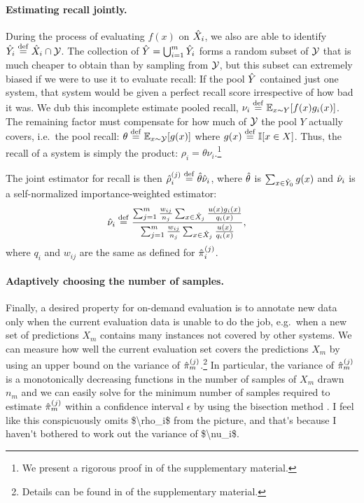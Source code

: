 \paragraph{Estimating recall jointly.}
During the process of evaluating $f(x)$ on ${\hat{X}}_i$, we also are able to identify ${\hat{Y}}_i \stackrel{\rm def}{=} {\hat{X}}_i \cap \mathcal{Y}$.
The collection of ${\hat{Y}} = \bigcup_{i=1}^m {\hat{Y}}_i$ forms a random subset of $\mathcal{Y}$ that is much cheaper to obtain than by sampling from $\mathcal{Y}$, but this subset can extremely biased if we were to use it to evaluate recall: 
If the pool ${\hat{Y}}$ contained just one system, that system would be given a perfect recall score irrespective of how bad it was.
We dub this incomplete estimate pooled recall, $\nu_i \stackrel{\rm def}{=} \mathbb{E}_{x \sim Y}[f(x) g_i(x)]$.
The remaining factor must compensate for how much of $\mathcal{Y}$ the pool $Y$ actually covers, i.e.\ the pool recall: $\theta \stackrel{\rm def}{=} \mathbb{E}_{x \sim \mathcal{Y}}[g(x)]$ where $g(x) \stackrel{\rm def}{=} \mathbb{I}[x \in X]$.
Thus, the recall of a system is simply the product: $\rho_i = \theta \nu_i$.\footnote{%
We present a rigorous proof in  of the supplementary material.}

The joint estimator for recall is then ${\hat{\rho}}_i^{(j)} \stackrel{\rm def}{=} {\hat{\theta}}{\hat{\nu}}_i$, where ${\hat{\theta}}$ is $\sum_{x \in {\hat{Y}}_0} g(x)$ and ${\hat{\nu}}_i$ is a self-normalized importance-weighted estimator:
\begin{align*}
  {\hat{\nu}}_i &\stackrel{\rm def}{=} \frac{\sum_{j=1}^m \frac{w_{ij}}{n_j} \sum_{x \in {\hat{X}}_j} \frac{u(x) g_i(x)}{q_i(x)}}{\sum_{j=1}^m \frac{w_{ij}}{n_j} \sum_{x \in {\hat{X}}_j} \frac{u(x)}{q_i(x)}},
\end{align*}
where $q_i$ and $w_{ij}$ are the same as defined for ${\hat{\pi}}_i^{(j)}$.

\paragraph{Adaptively choosing the number of samples.}
Finally, a desired property for on-demand evaluation is to annotate new data only when the current evaluation data is unable to do the job, e.g.\ when a new set of predictions $X_m$ contains many instances not covered by other systems.
We can measure how well the current evaluation set covers the predictions $X_m$ by using an upper bound on the variance of ${\hat{\pi}}_m^{(j)}$.\footnote{Details can be found in  of the supplementary material.}
In particular, the variance of ${\hat{\pi}}_m^{(j)}$ is a monotonically decreasing functions in the number of samples of $X_m$ drawn $n_m$ and we can easily solve for the minimum number of samples required to estimate ${\hat{\pi}}_m^{(j)}$ within a confidence interval $\epsilon$ by using the bisection method \citep{burden1985bisection}. \ac{I feel like this conspicuously omits $\rho_i$ from the picture, and that's because I haven't bothered to work out the variance of $\nu_i$.}

